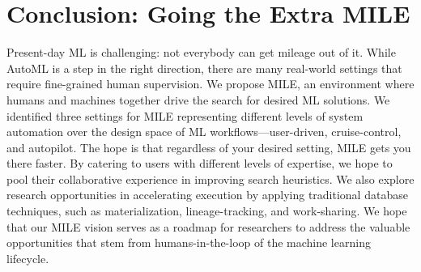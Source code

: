 \documentclass[11pt,dvipdfmx]{article}
\newcommand{\system}{{\sf MILE}\xspace}
\begin{document}
\section{Conclusion: Going the Extra \system}
\label{sec:conclusion}
Present-day ML is challenging: not everybody can get mileage out of it. 
While AutoML is a step in the right direction, there are many real-world settings
that require fine-grained human supervision.
We propose \system, an environment
where humans and machines together drive the search for desired ML solutions.
We identified three settings for \system representing
different levels of system automation over the design space of ML workflows---user-driven, cruise-control, and autopilot. 
The hope is that regardless of your desired setting, \system gets you there faster.
By catering to users with different levels of expertise, 
we hope to pool their collaborative experience in improving search heuristics. 
We also explore research opportunities in accelerating execution 
by applying traditional database techniques, such as materialization, lineage-tracking, and work-sharing. 
We hope that our \system vision serves as a roadmap for researchers to 
address the valuable opportunities that stem from humans-in-the-loop of the machine learning lifecycle.
\end{document}
